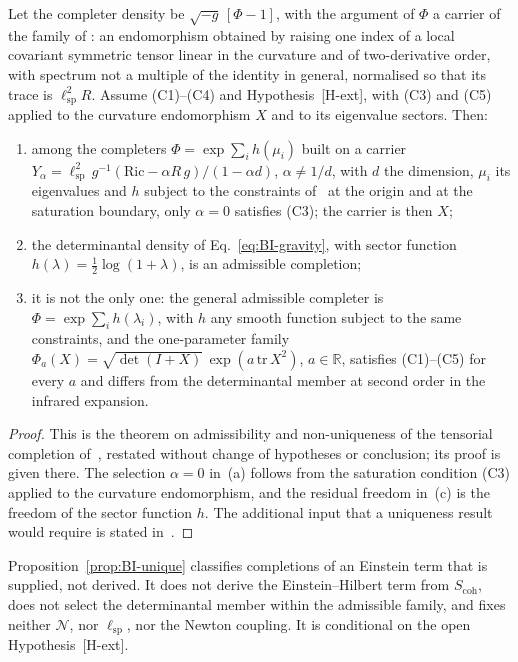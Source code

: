   \begin{proposition}
    \label{prop:BI-unique}
    Let the completer density be $\sqrt{-g}\,[\Phi - 1]$, with the argument of $\Phi$ a carrier of the family of
    \cite{Beau2026h}: an endomorphism obtained by raising one index of a local covariant symmetric tensor linear in
    the curvature and of two-derivative order, with spectrum not a multiple of the identity in general, normalised so
    that its trace is $\ell_{\mathrm{sp}}^{2} R$.
    Assume (C1)--(C4) and Hypothesis~[H-ext], with (C3) and (C5) applied to the curvature endomorphism $X$ and to
    its eigenvalue sectors.
    Then:
    \begin{enumerate}[label=(\alph*)]
      \item among the completers $\Phi = \exp\sum_i h(\mu_i)$ built on a carrier
      $Y_\alpha = \ell_{\mathrm{sp}}^{2}\, g^{-1}(\mathrm{Ric} - \alpha R\, g)/(1 - \alpha d)$, $\alpha \neq 1/d$, with $d$ the dimension,
      $\mu_i$ its eigenvalues and $h$ subject to the constraints of~\cite{Beau2026h} at the origin and at the saturation
      boundary, only $\alpha = 0$ satisfies (C3); the carrier is then $X$;
      \item the determinantal density of Eq.~\eqref{eq:BI-gravity}, with sector function
      $h(\lambda) = \tfrac12\log(1 + \lambda)$, is an admissible completion;
      \item it is not the only one: the general admissible completer is $\Phi = \exp\sum_i h(\lambda_i)$, with $h$
      any smooth function subject to the same constraints, and the one-parameter family
      $\Phi_a(X) = \sqrt{\det(I + X)}\,\exp(a\,\mathrm{tr}\,X^2)$, $a \in \mathbb{R}$, satisfies (C1)--(C5) for
      every $a$ and differs from the determinantal member at second order in the infrared expansion.
    \end{enumerate}
  \end{proposition}

  \begin{proof}
    This is the theorem on admissibility and non-uniqueness of the tensorial completion of~\cite{Beau2026h},
    restated without change of hypotheses or conclusion; its proof is given there.
    The selection $\alpha = 0$ in~(a) follows from the saturation condition (C3) applied to the curvature
    endomorphism, and the residual freedom in~(c) is the freedom of the sector function $h$.
    The additional input that a uniqueness result would require is stated in~\cite{Beau2026h}.
  \end{proof}

  \begin{remark}[Scope]
    Proposition~\ref{prop:BI-unique} classifies completions of an Einstein term that is supplied, not derived.
    It does not derive the Einstein--Hilbert term from $S_{\mathrm{coh}}$, does not select the determinantal member
    within the admissible family, and fixes neither $\mathcal{N}$, nor $\ell_{\mathrm{sp}}$, nor the Newton coupling.
    It is conditional on the open Hypothesis~[H-ext].
  \end{remark}
